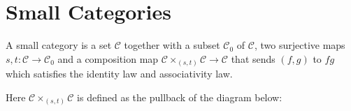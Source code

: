 \documentclass[
	11pt, %
	fleqn, %
	a4paper, %
]{LegrandOrangeBook}
\newcommand{\C}{\mathcal{C}} %
\begin{document}
\section{Small Categories}

\begin{definition}
    A small category is a set $\C$ together with a subset $\C_0$ of $\C$, two surjective maps $s, t : \C \to \C_0$ and a composition map $\C \times_{(s, t)} \C \to \C$ that sends $(f, g)$ to $fg$ which satisfies the identity law and associativity law.
\end{definition}

Here $\C \times_{(s, t)} \C$ is defined as the pullback of the diagram below:
\begin{center}
\end{center}


\end{document}
